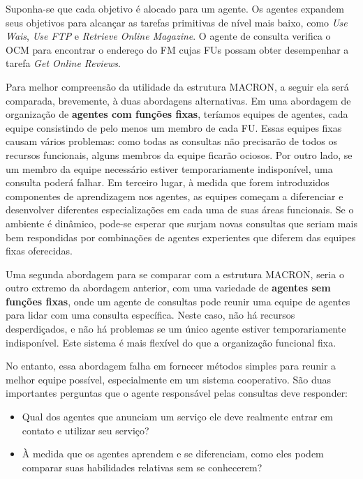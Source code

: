 \begin{description}
Suponha-se que cada objetivo é alocado para um agente. Os agentes expandem seus objetivos para alcançar as tarefas primitivas de nível mais baixo, como \textit{Use Wais}, \textit{Use FTP} e \textit{Retrieve Online Magazine}. O agente de consulta verifica o OCM para encontrar o endereço do FM cujas FUs possam obter desempenhar a tarefa \textit{Get Online Reviews}.

Para melhor compreensão da utilidade da estrutura MACRON, a seguir ela será comparada, brevemente, à duas abordagens alternativas. Em uma abordagem de organização de \textbf{agentes com funções fixas}, teríamos equipes de agentes, cada equipe consistindo de pelo menos um membro de cada FU. Essas equipes fixas causam vários problemas: como todas as consultas não precisarão de todos os recursos funcionais, alguns membros da equipe ficarão ociosos. Por outro lado, se um membro da equipe necessário estiver temporariamente indisponível, uma consulta poderá falhar. Em terceiro lugar, à medida que forem introduzidos componentes de aprendizagem nos agentes, as equipes começam a diferenciar e desenvolver diferentes especializações em cada uma de suas áreas funcionais. Se o ambiente é dinâmico, pode-se esperar que surjam novas consultas que seriam mais bem respondidas por combinações de agentes experientes que diferem das equipes fixas oferecidas.

Uma segunda abordagem para se comparar com a estrutura MACRON, seria o outro extremo da abordagem anterior, com uma variedade de \textbf{agentes sem funções fixas}, onde um agente de consultas pode reunir uma equipe de agentes para lidar com uma consulta específica. Neste caso, não há recursos desperdiçados, e não há problemas se um único agente estiver temporariamente indisponível. Este sistema é mais flexível do que a organização funcional fixa.

No entanto, essa abordagem falha em fornecer métodos simples para reunir a melhor equipe possível, especialmente em um sistema cooperativo. São duas importantes perguntas que o agente responsável pelas consultas deve responder: 

\begin{itemize}
    \item Qual dos agentes que anunciam um serviço ele deve realmente entrar em contato e utilizar seu serviço?
    \item À medida que os agentes aprendem e se diferenciam, como eles podem comparar suas habilidades relativas sem se conhecerem?
\end{itemize}


\end{description}
